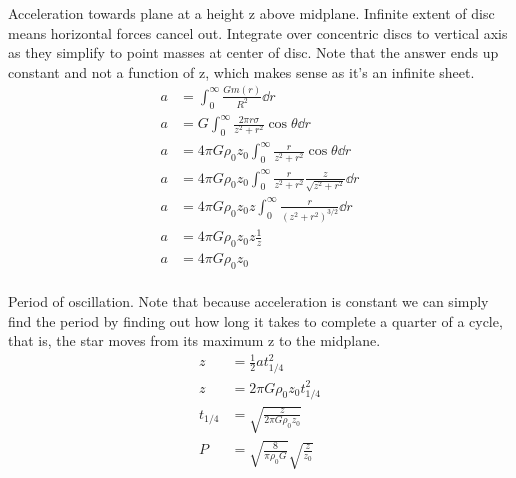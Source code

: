 \documentclass{homework}
\begin{document}
\question
Acceleration towards plane at a height z above midplane. Infinite extent of disc means horizontal forces cancel out. Integrate over concentric discs to vertical axis as they simplify to point masses at center of disc. Note that the answer ends up constant and not a function of z, which makes sense as it's an infinite sheet.
\begin{align*}
    a   &=	\int_0^\infty \frac{Gm(r)}{R^2}	\dd{r} \\
    a   &= G	\int_0^\infty \frac{2\pi r \sigma}{z^2 + r^2} \cos{\theta}	\dd{r} \\
    a   &=  4\pi G \rho_0 z_0 \int_0^\infty \frac{r}{z^2 + r^2} \cos{\theta}	\dd{r} \\
    a   &=  4\pi G \rho_0 z_0 \int_0^\infty \frac{r}{z^2 + r^2} \frac{z}{\sqrt{z^2+r^2}}	\dd{r} \\
    a   &=  4\pi G \rho_0 z_0 z \int_0^\infty \frac{r}{(z^2 + r^2)^{3/2}} \dd{r} \\
    a   &=  4\pi G \rho_0 z_0 z \frac{1}{z} \\
    a   &=  \boxed{4\pi G \rho_0 z_0} \\
\end{align*}


\question
Period of oscillation. Note that because acceleration is constant we can simply find the period by finding out how long it takes to complete a quarter of a cycle, that is, the star moves from its maximum z to the midplane.
\begin{align*}
    z   &=  \frac{1}{2}at_{1/4}^2 \\
    z   &=  2\pi G \rho_0 z_0 t_{1/4}^2 \\
    t_{1/4} &=  \sqrt{\frac{z}{2\pi G \rho_0 z_0}}  \\
    P   &=  \boxed{\sqrt{\frac{8}{\pi \rho_0 G}} \sqrt{\frac{z}{z_0}}}
\end{align*}
\end{document}
